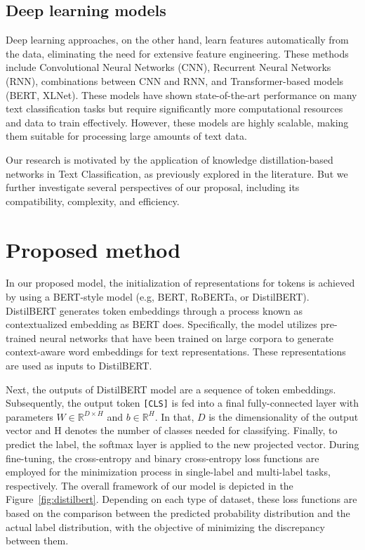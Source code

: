 \documentclass[sn-mathphys,Numbered]{sn-jnl}%
\theoremstyle{thmstyleone}%
\theoremstyle{thmstyletwo}%
\theoremstyle{thmstylethree}%
\begin{document}
\subsection{Deep learning models}
Deep learning approaches, on the other hand, learn features automatically from the data, eliminating the need for extensive feature engineering. These methods include Convolutional Neural Networks (CNN)\cite{Kim2014}, Recurrent Neural Networks (RNN)\cite{Cho2014, Sutskever2014}, combinations between CNN and RNN\cite{Vo2017}, and Transformer-based models (BERT, XLNet)\cite{Devlin2019, Yang2019}. These models have shown state-of-the-art performance on many text classification tasks but require significantly more computational resources and data to train effectively. However, these models are highly scalable, making them suitable for processing large amounts of text data.

Our research is motivated by the application of knowledge distillation-based networks\cite{Gasparetto2022} in Text Classification, as previously explored in the literature. But we further investigate several perspectives of our proposal, including its compatibility, complexity, and efficiency.

\section{Proposed method}\label{proposedmethod}
In our proposed model, the initialization of representations for tokens is achieved by using a BERT-style model (e.g, BERT, RoBERTa, or DistilBERT). DistilBERT generates token embeddings through a process known as contextualized embedding as BERT does. Specifically, the model utilizes pre-trained neural networks that have been trained on large corpora to generate context-aware word embeddings for text representations. These representations are used as inputs to DistilBERT.

Next, the outputs of DistilBERT model are a sequence of token embeddings. Subsequently, the output token \texttt{[CLS]} is fed into a final fully-connected layer with parameters $W \in \mathbb{R}^{D\times H}$ and $b \in \mathbb{R}^H$. In that, $D$ is the dimensionality of the output vector and H denotes the number of classes needed for classifying. Finally, to predict the label, the softmax layer is applied to the new projected vector. During fine-tuning, the cross-entropy and binary cross-entropy loss functions are employed for the minimization process in single-label and multi-label tasks, respectively. The overall framework of our model is depicted in the Figure~\ref{fig:distilbert}. Depending on each type of dataset, these loss functions are based on the comparison between the predicted probability distribution and the actual label distribution, with the objective of minimizing the discrepancy between them.
\end{document}
